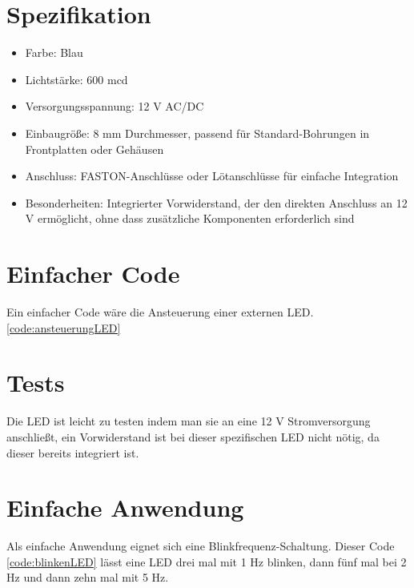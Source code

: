 \section{Spezifikation}
\begin{itemize}
	\item Farbe: Blau
	\item Lichtstärke: 600 mcd
	\item Versorgungsspannung: 12 V AC/DC
	\item Einbaugröße: 8 mm Durchmesser, passend für Standard-Bohrungen in Frontplatten oder Gehäusen
	\item Anschluss: FASTON-Anschlüsse oder Lötanschlüsse für einfache Integration
	\item Besonderheiten: Integrierter Vorwiderstand, der den direkten Anschluss an 12 V ermöglicht, ohne dass zusätzliche Komponenten erforderlich sind
\end{itemize}
\cite{ReicheltLED:2025} \cite{CML:2011}


\section{Einfacher Code}
Ein einfacher Code wäre die Ansteuerung einer externen LED.\ref{code:ansteuerungLED}
\begin{code}[H]
	\caption{Einfacher Code zur Ansteuerung einer externen LED	}
	\label{code:ansteuerungLED}
\end{code}

\section{Tests}
Die LED ist leicht zu testen indem man sie an eine 12 V Stromversorgung anschließt, ein Vorwiderstand ist bei dieser spezifischen LED nicht nötig, da dieser bereits integriert ist.

\section{Einfache Anwendung}
Als einfache Anwendung eignet sich eine Blinkfrequenz-Schaltung. Dieser Code \ref{code:blinkenLED} lässt eine LED drei mal mit 1 Hz blinken, dann fünf mal bei 2 Hz und dann zehn mal mit 5 Hz.
\begin{code}[H]
	\caption{Einfacher Code zum Blinken einer externen LED	}
	\label{code:blinkenLED}
\end{code}

